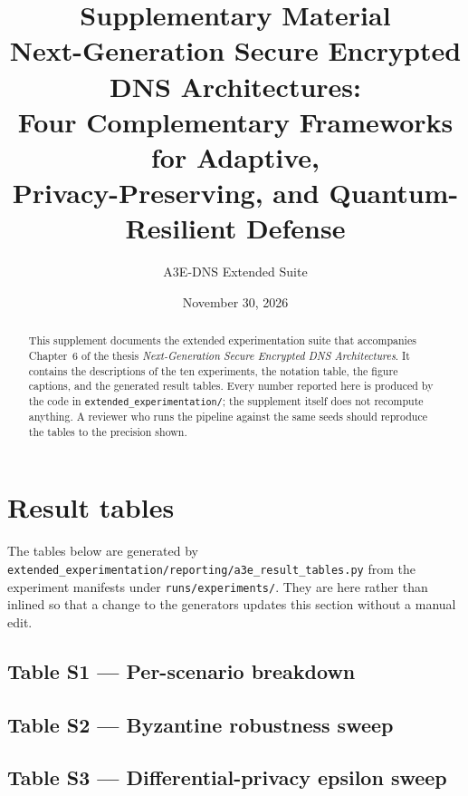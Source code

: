 \documentclass[11pt,a4paper]{article}
\title{
    \textbf{Supplementary Material} \\
    \large Next-Generation Secure Encrypted DNS Architectures: \\
    \large Four Complementary Frameworks for Adaptive, \\
    \large Privacy-Preserving, and Quantum-Resilient Defense
}
\author{A3E-DNS Extended Suite}
\date{November 30, 2026}
\begin{document}
\maketitle

\begin{abstract}
\noindent
This supplement documents the extended experimentation suite that
accompanies Chapter~6 of the thesis \emph{Next-Generation Secure
Encrypted DNS Architectures}. It contains the descriptions of the
ten experiments, the notation table, the figure captions, and the
generated result tables. Every number reported here is produced by
the code in \texttt{extended\_experimentation/}; the supplement
itself does not recompute anything. A reviewer who runs the pipeline
against the same seeds should reproduce the tables to the precision
shown.
\end{abstract}

\tableofcontents
\newpage


\newpage


\newpage


\newpage

\section{Result tables}

The tables below are generated by
\texttt{extended\_experimentation/reporting/a3e\_result\_tables.py}
from the experiment manifests under
\texttt{runs/experiments/}. They are \verb|| here rather than
inlined so that a change to the generators updates this section
without a manual edit.

\subsection*{Table S1 --- Per-scenario breakdown}


\subsection*{Table S2 --- Byzantine robustness sweep}


\subsection*{Table S3 --- Differential-privacy epsilon sweep}

\end{document}
